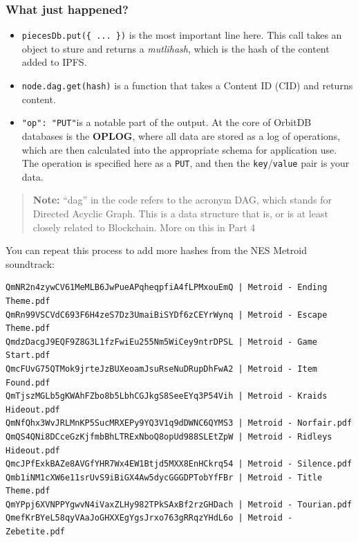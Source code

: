 \subsubsection{What just happened?}\label{what-just-happened-6}

\begin{itemize}
\tightlist
\item
  \texttt{piecesDb.put(\{\ ...\ \})} is the most important line here.
  This call takes an object to sture and returns a \emph{mutlihash},
  which is the hash of the content added to IPFS.
\item
  \texttt{node.dag.get(hash)} is a function that takes a Content ID
  (CID) and returns content.
\item
  \texttt{"op":\ "PUT"}is a notable part of the output. At the core of
  OrbitDB databases is the \textbf{OPLOG}, where all data are stored as
  a log of operations, which are then calculated into the appropriate
  schema for application use. The operation is specified here as a
  \texttt{PUT}, and then the \texttt{key}/\texttt{value} pair is your
  data.
\end{itemize}

\begin{quote}
\textbf{Note:} ``dag'' in the code refers to the acronym DAG, which
stands for Directed Acyclic Graph. This is a data structure that is, or
is at least closely related to Blockchain. More on this in Part 4
\end{quote}

You can repeat this process to add more hashes from the NES Metroid
soundtrack:

\begin{verbatim}
QmNR2n4zywCV61MeMLB6JwPueAPqheqpfiA4fLPMxouEmQ | Metroid - Ending Theme.pdf
QmRn99VSCVdC693F6H4zeS7Dz3UmaiBiSYDf6zCEYrWynq | Metroid - Escape Theme.pdf
QmdzDacgJ9EQF9Z8G3L1fzFwiEu255Nm5WiCey9ntrDPSL | Metroid - Game Start.pdf
QmcFUvG75QTMok9jrteJzBUXeoamJsuRseNuDRupDhFwA2 | Metroid - Item Found.pdf
QmTjszMGLb5gKWAhFZbo8b5LbhCGJkgS8SeeEYq3P54Vih | Metroid - Kraids Hideout.pdf
QmNfQhx3WvJRLMnKP5SucMRXEPy9YQ3V1q9dDWNC6QYMS3 | Metroid - Norfair.pdf
QmQS4QNi8DCceGzKjfmbBhLTRExNboQ8opUd988SLEtZpW | Metroid - Ridleys Hideout.pdf
QmcJPfExkBAZe8AVGfYHR7Wx4EW1Btjd5MXX8EnHCkrq54 | Metroid - Silence.pdf
Qmb1iNM1cXW6e11srUvS9iBiGX4Aw5dycGGGDPTobYfFBr | Metroid - Title Theme.pdf
QmYPpj6XVNPPYgwvN4iVaxZLHy982TPkSAxBf2rzGHDach | Metroid - Tourian.pdf
QmefKrBYeL58qyVAaJoGHXXEgYgsJrxo763gRRqzYHdL6o | Metroid - Zebetite.pdf
\end{verbatim}

